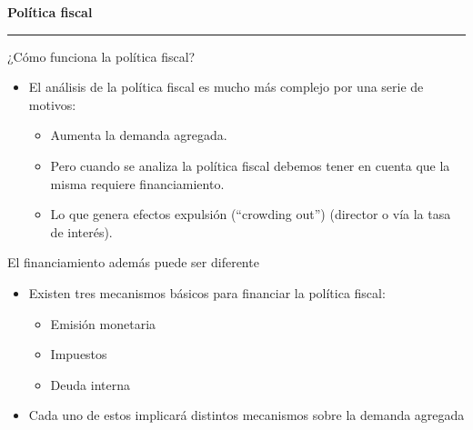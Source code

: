 \documentclass{beamer}
\begin{document}
\begin{frame}{}
\centering 	\huge \textbf{Política fiscal} 
\vspace{2mm}
\hrule
\end{frame}

\begin{frame}{¿Cómo funciona la política fiscal?}
    
    \begin{itemize}
        \item El análisis de la política fiscal es mucho más complejo por una serie de motivos:
        \begin{itemize}
            \item Aumenta la demanda agregada. 
            \item Pero cuando se analiza la política fiscal debemos tener en cuenta que la misma requiere financiamiento.
            \item Lo que genera efectos expulsión (“crowding out”) (director o vía la tasa de interés).
        \end{itemize}

    \end{itemize}

\end{frame}


\begin{frame}{El financiamiento además puede ser diferente}
    
    \begin{itemize}
        \item Existen tres mecanismos básicos para financiar la política fiscal:
        \begin{itemize}
            \item Emisión monetaria 
            \item Impuestos
            \item Deuda interna
         
        \end{itemize}
        \item Cada uno de estos implicará distintos mecanismos sobre la demanda agregada
    \end{itemize}

\end{frame}
\end{document}
